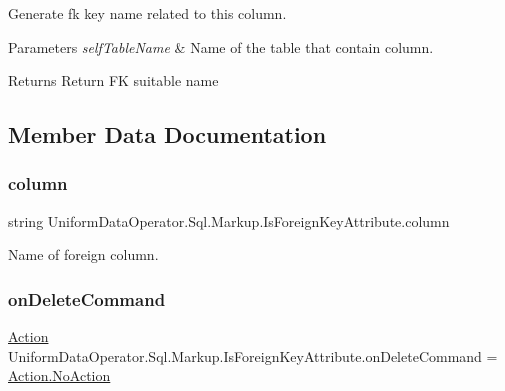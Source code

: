 Generate fk key name related to this column. 


\begin{DoxyParams}{Parameters}
{\em self\+Table\+Name} & Name of the table that contain column.\\
\hline
\end{DoxyParams}
\begin{DoxyReturn}{Returns}
Return FK suitable name
\end{DoxyReturn}


\subsection{Member Data Documentation}
\mbox{\label{class_uniform_data_operator_1_1_sql_1_1_markup_1_1_is_foreign_key_attribute_aa305b69f1eac8e7335b9776b5d30625e}} 
\subsubsection{\texorpdfstring{column}{column}}
{\footnotesize\ttfamily string Uniform\+Data\+Operator.\+Sql.\+Markup.\+Is\+Foreign\+Key\+Attribute.\+column}



Name of foreign column. 

\mbox{\label{class_uniform_data_operator_1_1_sql_1_1_markup_1_1_is_foreign_key_attribute_a5055e5326f37afb695398139353139b2}} 
\subsubsection{\texorpdfstring{on\+Delete\+Command}{onDeleteCommand}}
{\footnotesize\ttfamily \mbox{\hyperlink{class_uniform_data_operator_1_1_sql_1_1_markup_1_1_is_foreign_key_attribute_ae6c77deaf80d5c4d07709edf51eaebc5}{Action}} Uniform\+Data\+Operator.\+Sql.\+Markup.\+Is\+Foreign\+Key\+Attribute.\+on\+Delete\+Command = \mbox{\hyperlink{class_uniform_data_operator_1_1_sql_1_1_markup_1_1_is_foreign_key_attribute_ae6c77deaf80d5c4d07709edf51eaebc5a1e601ea653db1c729c9ee5746730fabe}{Action.\+No\+Action}}}



